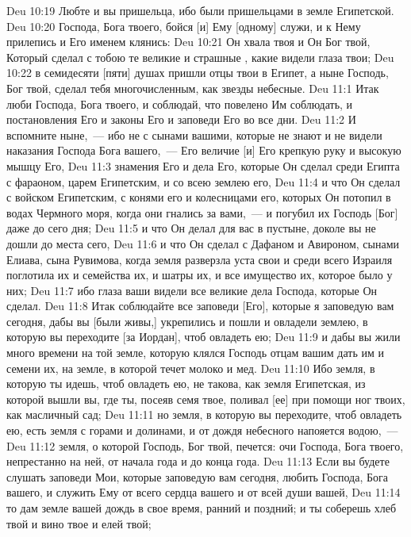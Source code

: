 \vs Deu 10:19 Любте и вы пришельца, ибо  были пришельцами в земле Египетской.
\vs Deu 10:20 Господа, Бога твоего, бойся [и] Ему [одному] служи, и к Нему прилепись и Его именем клянись:
\vs Deu 10:21 Он хвала твоя и Он Бог твой, Который сделал с тобою те великие и страшные , какие видели глаза твои;
\vs Deu 10:22 в семидесяти [пяти] душах пришли отцы твои в Египет, а ныне Господь, Бог твой, сделал тебя многочисленным, как звезды небесные.
\vs Deu 11:1 Итак люби Господа, Бога твоего, и соблюдай, что повелено Им соблюдать, и постановления Его и законы Его и заповеди Его во все дни.
\vs Deu 11:2 И вспомните ныне,~--- ибо  не с сынами вашими, которые не знают и не видели наказания Господа Бога вашего,~--- Его величие [и] Его крепкую руку и высокую мышцу Его,
\vs Deu 11:3 знамения Его и дела Его, которые Он сделал среди Египта с фараоном, царем Египетским, и со всею землею его,
\vs Deu 11:4 и что Он сделал с войском Египетским, с конями его и колесницами его, которых Он потопил в водах Чермного моря, когда они гнались за вами,~--- и погубил их Господь [Бог] даже до сего дня;
\vs Deu 11:5 и что Он делал для вас в пустыне, доколе вы не дошли до места сего,
\vs Deu 11:6 и что Он сделал с Дафаном и Авироном, сынами Елиава, сына Рувимова, когда земля разверзла уста свои и среди всего Израиля поглотила их и семейства их, и шатры их, и все имущество их, которое было у них;
\vs Deu 11:7 ибо глаза ваши видели все великие дела Господа, которые Он сделал.
\vs Deu 11:8 Итак соблюдайте все заповеди [Его], которые я заповедую вам сегодня, дабы вы [были живы,] укрепились и пошли и овладели землею, в которую вы переходите [за Иордан], чтоб овладеть ею;
\vs Deu 11:9 и дабы вы жили много времени на той земле, которую клялся Господь отцам вашим дать им и семени их, на земле, в которой течет молоко и мед.
\vs Deu 11:10 Ибо земля, в которую ты идешь, чтоб овладеть ею, не такова, как земля Египетская, из которой вышли вы, где ты, посеяв семя твое, поливал [ее] при помощи ног твоих, как масличный сад;
\vs Deu 11:11 но земля, в которую вы переходите, чтоб овладеть ею, есть земля с горами и долинами, и от дождя небесного напояется водою,~---
\vs Deu 11:12 земля, о которой Господь, Бог твой, печется: очи Господа, Бога твоего, непрестанно на ней, от начала года и до конца года.
\vs Deu 11:13 Если вы будете слушать заповеди Мои, которые заповедую вам сегодня, любить Господа, Бога вашего, и служить Ему от всего сердца вашего и от всей души вашей,
\vs Deu 11:14 то дам земле вашей дождь в свое время, ранний и поздний; и ты соберешь хлеб твой и вино твое и елей твой;
